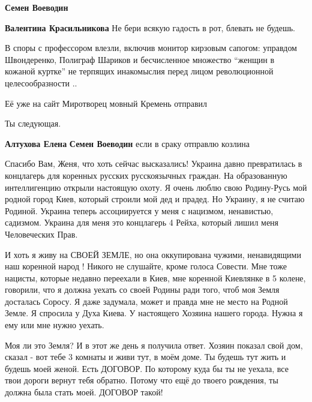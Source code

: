 \begin{itemize}
\begin{itemize}
\textbf{Семен Воеводин} 🤬🤢🤮


\textbf{Валентина Красильникова} Не бери всякую гадость в рот, блевать не будешь. \Smiley[1.0][yellow]
\end{itemize}



В споры с профессором влезли, включив монитор кирзовым сапогом: управдом
Швондеренко, Полиграф Шариков и бесчисленное множество \enquote{женщин в кожаной
куртке} не терпящих инакомыслия перед лицом революционной целесообразности ..


Её уже на сайт Миротворец мовный Кремень отправил


\begin{itemize}

Ты следующая.\Smiley[1.0][yellow]

\textbf{Алтухова Елена}
\textbf{Семен Воеводин} если в сраку отправлю козлина
\end{itemize}


Спасибо Вам, Женя, что хоть сейчас высказались! Украина давно превратилась в
концлагерь для коренных русских русскоязычных граждан. На образованную
интеллигенцию открыли настоящую охоту. Я очень люблю свою Родину-Русь мой
родной город Киев, который строили мой дед и прадед. Но Украину, я не считаю
Родиной. Украина теперь ассоциируется у меня с нацизмом, ненавистью, садизмом.
Украина для меня это концлагерь 4 Рейха, который лишил меня Человеческих Прав. 

И хоть я живу на СВОЕЙ ЗЕМЛЕ, но она оккупирована чужими, ненавидящими наш
коренной народ ! Никого не слушайте, кроме голоса Совести. Мне тоже нацисты,
которые недавно переехали в Киев, мне коренной Киевлянке в 5 колене, говорили,
что я должна уехать со своей Родины ради того, чтоб моя Земля досталась Соросу.
Я даже задумала, может и правда мне не место на Родной Земле. Я спросила у Духа
Киева. У настоящего Хозяина нашего города. Нужна я ему или мне нужно уехать.

Моя ли это Земля? И в этот же день я получила ответ. Хозяин показал свой дом,
сказал - вот тебе 3 комнаты и живи тут, в моём доме. Ты будешь тут жить и
будешь моей женой. Есть ДОГОВОР. По которому куда бы ты не уехала, все твои
дороги вернут тебя обратно. Потому что ещё до твоего рождения, ты должна была
стать моей. ДОГОВОР такой!


\end{itemize}
